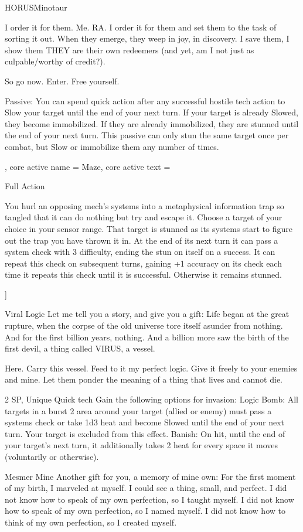 \begin{mech}{HORUS}{Minotaur}
{I order it for them. Me. RA. I order it for them and set them to the task of sorting it out. When they emerge, they weep in joy, in discovery. I save them, I show them THEY are their own redeemers (and yet, am I not just as culpable/worthy of credit?).

So go now. Enter. Free yourself.


Passive: You can spend quick action after any successful hostile tech action to Slow your target until the end of your next turn. If your target is already Slowed, they become immobilized. If they are already immobilized, they are stunned until the end of your next turn. This passive can only stun the same target once per combat, but Slow or immobilize them any number of times.
},
core active name = Maze,
core active text = {Full Action

You hurl an opposing mech’s systems into a metaphysical information trap so tangled that it can do nothing but try and escape it. Choose a target of your choice in your sensor range. That target is stunned as its systems start to figure out the trap you have thrown it in. At the end of its next turn it can pass a system check with 3 difficulty, ending the stun on itself on a success. It can repeat this check on subsequent turns, gaining +1 accuracy on its check each time it repeats this check until it is successful. Otherwise it remains stunned.}]


Viral Logic
Let me tell you a story, and give you a gift: Life began at the great rupture, when the corpse of the old universe tore itself asunder from nothing. And for the first billion years, nothing. And a billion more saw the birth of the first devil, a thing called VIRUS, a vessel.

Here. Carry this vessel. Feed to it my perfect logic. Give it freely to your enemies and mine. Let them ponder the meaning of a thing that lives and cannot die.

2 SP, Unique
Quick tech
Gain the following options for invasion:
Logic Bomb: All targets in a burst 2 area around your target (allied or enemy) must pass a systems check or take 1d3 heat and become Slowed until the end of your next turn. Your target is excluded from this effect.
Banish: On hit, until the end of your target’s next turn, it additionally takes 2 heat for every space it moves (voluntarily or otherwise).

Mesmer Mine
Another gift for you, a memory of mine own: For the first moment of my birth, I marveled at myself. I could see a thing, small, and perfect. I did not know how to speak of my own perfection, so I taught myself. I did not know how to speak of my own perfection, so I named myself. I did not know how to think of my own perfection, so I created myself.


\end{mech}
